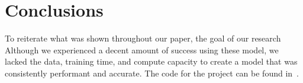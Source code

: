 \section{Conclusions}
To reiterate what was shown throughout our paper, the goal of our research 
Although we experienced a decent amount of success using these model, we lacked the data, training time, and compute capacity to create a model that was consistently performant and accurate.
The code for the project can be found in~\cite{FruitFly}.
